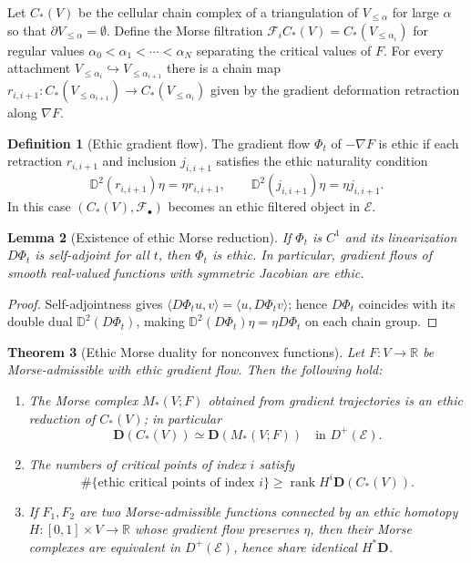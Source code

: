 \documentclass[12pt]{article}
\DeclareMathOperator{\rank}{rank}
\newcommand{\RR}{\mathbb{R}}
\newcommand{\E}{\mathcal{E}}
\newcommand{\DD}{\mathbb{D}}
\theoremstyle{plain}
\newtheorem{theorem}{Theorem}[section]
\newtheorem{lemma}[theorem]{Lemma}
\theoremstyle{definition}
\newtheorem{definition}[theorem]{Definition}
\theoremstyle{remark}
\numberwithin{equation}{section}
\begin{document}
Let $C_\ast(V)$ be the cellular chain complex of a triangulation of $V_{\le \alpha}$ for large $\alpha$ so that $\partial V_{\le \alpha}=\emptyset$.  
Define the Morse filtration $\mathcal F_iC_\ast(V)=C_\ast(V_{\le \alpha_i})$ for regular values $\alpha_0<\alpha_1<\cdots<\alpha_N$ separating the critical values of $F$.  
For every attachment $V_{\le\alpha_i}\hookrightarrow V_{\le\alpha_{i+1}}$ there is a chain map 
$r_{i,i+1}:C_\ast(V_{\le\alpha_{i+1}})\to C_\ast(V_{\le\alpha_i})$ 
given by the gradient deformation retraction along $\nabla F$.  

\begin{definition}[Ethic gradient flow]
The gradient flow $\Phi_t$ of $-\nabla F$ is ethic if each retraction $r_{i,i+1}$ and inclusion $j_{i,i+1}$ satisfies the ethic naturality condition
\[
\DD^2(r_{i,i+1})\eta=\eta r_{i,i+1},
\qquad
\DD^2(j_{i,i+1})\eta=\eta j_{i,i+1}.
\]
In this case $(C_\ast(V),\mathcal F_\bullet)$ becomes an ethic filtered object in $\E$.
\end{definition}

\begin{lemma}[Existence of ethic Morse reduction]
If $\Phi_t$ is $C^1$ and its linearization $D\Phi_t$ is self-adjoint for all $t$, then $\Phi_t$ is ethic.  
In particular, gradient flows of smooth real-valued functions with symmetric Jacobian are ethic.
\end{lemma}

\begin{proof}
Self-adjointness gives $\langle D\Phi_t u,v\rangle=\langle u,D\Phi_t v\rangle$; hence $D\Phi_t$ coincides with its double dual $\DD^2(D\Phi_t)$, making $\DD^2(D\Phi_t)\eta=\eta D\Phi_t$ on each chain group.
\end{proof}

\begin{theorem}[Ethic Morse duality for nonconvex functions]
Let $F:V\to\RR$ be Morse-admissible with ethic gradient flow.  
Then the following hold:
\begin{enumerate}
\item The Morse complex $M_\ast(V;F)$ obtained from gradient trajectories is an ethic reduction of $C_\ast(V)$; in particular
\[
\mathbf D(C_\ast(V))\simeq \mathbf D(M_\ast(V;F)) \quad\text{in }D^{+}(\E).
\]
\item The numbers of critical points of index $i$ satisfy
\[
\#\{\text{ethic critical points of index }i\}\ge
\rank H^i\mathbf D(C_\ast(V)).
\]
\item If $F_1,F_2$ are two Morse-admissible functions connected by an ethic homotopy $H:[0,1]\times V\to\RR$ whose gradient flow preserves $\eta$, then their Morse complexes are equivalent in $D^{+}(\E)$, hence share identical $H^\ast\mathbf D$.
\end{enumerate}
\label{thm:ethic-morse-ineq}
\end{theorem}
\end{document}
